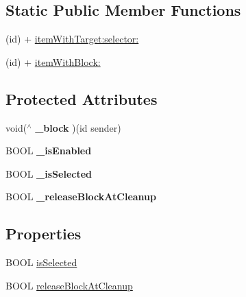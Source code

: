 \subsection*{Static Public Member Functions}
\begin{DoxyCompactItemize}
\item 
(id) + \hyperlink{interface_c_c_menu_item_a1f57776fb6cfdee876463c2a2f78d5d3}{item\-With\-Target\-:selector\-:}
\item 
(id) + \hyperlink{interface_c_c_menu_item_ae698450ec8bb3de154c730cb34404edb}{item\-With\-Block\-:}
\end{DoxyCompactItemize}
\subsection*{Protected Attributes}
\begin{DoxyCompactItemize}
\item 
\hypertarget{interface_c_c_menu_item_ac8e62ecdfef24a10cf44fa4801100559}{void($^\wedge$ {\bfseries \-\_\-block} )(id sender)}\label{interface_c_c_menu_item_ac8e62ecdfef24a10cf44fa4801100559}

\item 
\hypertarget{interface_c_c_menu_item_a604209ca04799bbb6d83387ad507f413}{B\-O\-O\-L {\bfseries \-\_\-is\-Enabled}}\label{interface_c_c_menu_item_a604209ca04799bbb6d83387ad507f413}

\item 
\hypertarget{interface_c_c_menu_item_a9e04b2d866a4847cd412f852fddf25a5}{B\-O\-O\-L {\bfseries \-\_\-is\-Selected}}\label{interface_c_c_menu_item_a9e04b2d866a4847cd412f852fddf25a5}

\item 
\hypertarget{interface_c_c_menu_item_a10b44cb2801f54aed33b61abcc7defeb}{B\-O\-O\-L {\bfseries \-\_\-release\-Block\-At\-Cleanup}}\label{interface_c_c_menu_item_a10b44cb2801f54aed33b61abcc7defeb}

\end{DoxyCompactItemize}
\subsection*{Properties}
\begin{DoxyCompactItemize}
\item 
B\-O\-O\-L \hyperlink{interface_c_c_menu_item_afb5f2156c708a728c74b0a47c489d1a0}{is\-Selected}
\item 
B\-O\-O\-L \hyperlink{interface_c_c_menu_item_a988b42590257fa3d9c878be9aeb5e527}{release\-Block\-At\-Cleanup}
\end{DoxyCompactItemize}


